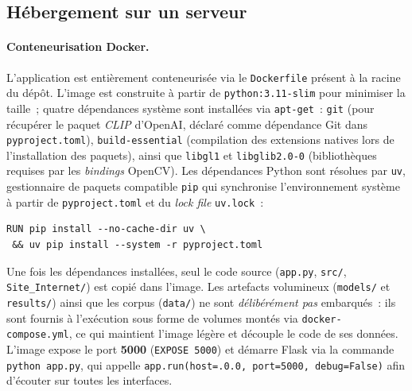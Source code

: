 \documentclass[a4paper,11pt]{article}
\begin{document}
\subsection{Hébergement sur un serveur}
\label{subsec:hosting}

\paragraph{Conteneurisation Docker.}
L'application est entièrement conteneurisée via le \texttt{Dockerfile}
présent à la racine du dépôt. L'image est construite à partir de
\texttt{python:3.11-slim} pour minimiser la taille~; quatre
dépendances système sont installées via \texttt{apt-get}~: \texttt{git}
(pour récupérer le paquet \textit{CLIP} d'OpenAI, déclaré comme
dépendance Git dans \texttt{pyproject.toml}), \texttt{build-essential}
(compilation des extensions natives lors de l'installation des paquets),
ainsi que \texttt{libgl1} et \texttt{libglib2.0-0} (bibliothèques
requises par les \textit{bindings} OpenCV). Les dépendances Python
sont résolues par \texttt{uv}, gestionnaire de paquets compatible
\texttt{pip} qui synchronise l'environnement système à partir de
\texttt{pyproject.toml} et du \textit{lock file} \texttt{uv.lock}~:
\begin{verbatim}
RUN pip install --no-cache-dir uv \
 && uv pip install --system -r pyproject.toml
\end{verbatim}
Une fois les dépendances installées, seul le code source
(\texttt{app.py}, \texttt{src/}, \texttt{Site\_Internet/}) est copié
dans l'image. Les artefacts volumineux (\texttt{models/} et
\texttt{results/}) ainsi que les corpus (\texttt{data/}) ne sont
\emph{délibérément pas} embarqués~: ils sont fournis à l'exécution sous
forme de volumes montés via \texttt{docker-compose.yml}, ce qui maintient
l'image légère et découple le code de ses données. L'image expose le
port \textbf{5000} (\texttt{EXPOSE 5000}) et démarre Flask via la
commande \texttt{python app.py}, qui appelle
\texttt{app.run(host=.0.0\textquotesingle{}, port=5000, debug=False)}
afin d'écouter sur toutes les interfaces.
\end{document}
